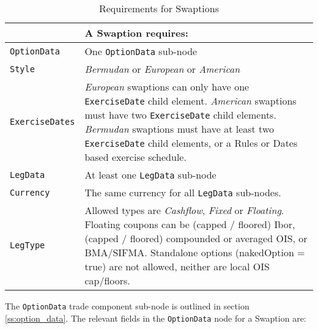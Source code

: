 \begin{table}[H]
\centering
\begin{tabular} {|l|p{10cm}|}
    \hline
        & \bfseries{A  Swaption requires:} \\  \hline
    \lstinline!OptionData! & One \lstinline!OptionData! sub-node  \\  \hline
    \lstinline!Style! &  \emph{Bermudan} or \emph{European} or \emph{American}\\ \hline
    \lstinline!ExerciseDates! & \emph{European} swaptions can only have one \lstinline!ExerciseDate! child element. \emph{American} swaptions must have two \lstinline!ExerciseDate! child elements. \emph{Bermudan} swaptions must have at least two \lstinline!ExerciseDate! child elements, or a Rules or Dates based exercise schedule. \\ \hline
    \lstinline!LegData! &  At least one \lstinline!LegData! sub-node \\ \hline
    \lstinline!Currency! & The same currency for all \lstinline!LegData! sub-nodes.\\ \hline
    \lstinline!LegType! & Allowed types are \emph{Cashflow}, \emph{Fixed} or \emph{Floating}. Floating coupons can be (capped / floored) Ibor, (capped / floored) compounded or averaged OIS, or BMA/SIFMA. Standalone options (nakedOption = true) are not allowed, neither are local OIS cap/floors. \\ \hline
  \end{tabular}
  \caption{Requirements for Swaptions}
  \label{tab:swaption_requirements}
\end{table}

The \lstinline!OptionData! trade component sub-node is outlined in section \ref{ss:option_data}. 
The relevant fields in the \lstinline!OptionData! node for a Swaption are:

